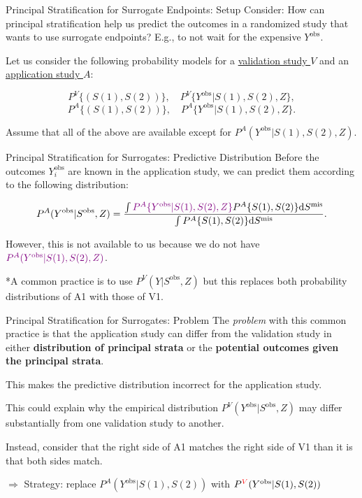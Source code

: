 \documentclass[10pt]{beamer}
\begin{document}
\begin{frame}{Principal Stratification for Surrogate Endpoints: Setup}
Consider: How can principal stratification help us predict the outcomes 
in a randomized study that wants to use surrogate endpoints? E.g., 
to not wait for the expensive $Y^{\text{obs}}$. 

Let us consider the following probability models for a \underline{validation 
study $V$} and an \underline{application study $A$}: 

\begin{equation}
    P^V\{(S(1), S(2))\}, \quad P^V\{Y^{\text{obs}} | S(1), S(2), Z\}, \tag{V1} 
\end{equation}
\begin{equation}
    P^A\{(S(1), S(2))\}, \quad P^A\{Y^{\text{obs}} | S(1), S(2), Z\}. \tag{A1}
\end{equation}

Assume that all of the above are available except for $P^A(Y^\text{obs} | S(1), S(2), Z)$.
\end{frame}

\begin{frame}{Principal Stratification for Surrogates: \small Predictive Distribution\normalsize}
Before the outcomes $Y_i^\text{obs}$ are known in the application study, 
we can predict them according to the following distribution: 

$$P^A(Y^\text{obs} | S^{\text{obs}}, Z) = \frac{\int {\color{violet}{P^A\{Y^\text{obs} | S(1), S(2), Z \}}}
P^A \{ S(1), S(2)\} \mathrm d S^{\text{mis}}}{
\int P^A\{ S(1), S(2) \} \mathrm d S^{\text{mis}}}.
$$

However, this is not available to us because we do not have 
$\color{violet}{P^A(Y^\text{obs} | S(1), S(2), Z)}$.

*A common practice is to use $P^V(Y | S^\text{obs}, Z)$ but this replaces both
probability distributions of A1 with those of V1.
\end{frame}

\begin{frame}{Principal Stratification for Surrogates: Problem}
The \textit{\color{orange}problem} with this common practice is that the application 
study can differ from the validation study in either \textbf{distribution of principal strata}
or the \textbf{potential outcomes given the principal strata}.

This makes the predictive distribution incorrect for the application study. 

This could explain why the empirical distribution $P^V(Y^\text{obs} | S^\text{obs}, Z)$ 
may differ substantially from one validation study to another. 

Instead, consider that the right side of A1 matches the right 
side of V1 than it is that both sides match. 

$\Rightarrow$ Strategy: replace $P^A(Y^\text{obs}|S(1),S(2))$ with 
$P^{\color{red} V} (Y^\text{obs}|S(1), S(2))$
\end{frame}
\end{document}
